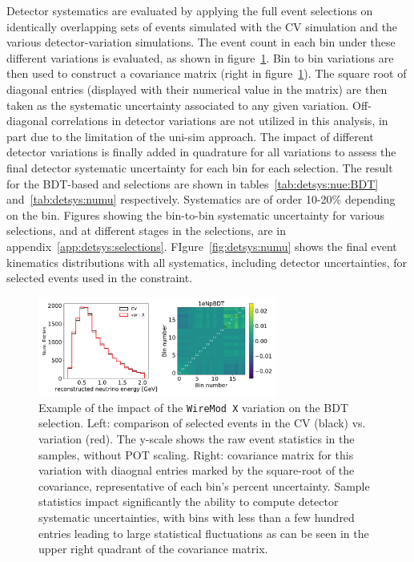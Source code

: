 \par Detector systematics are evaluated by applying the full event selections on identically overlapping sets of events simulated with the CV simulation and the various detector-variation simulations. The event count in each bin under these different variations is evaluated, as shown in figure~\ref{fig:detsys:selection}. Bin to bin variations are then used to construct a covariance matrix (right in figure~\ref{fig:detsys:selection}). The square root of diagonal entries (displayed with their numerical value in the matrix) are then taken as the systematic uncertainty associated to any given variation. Off-diagonal correlations in detector variations are not utilized in this analysis, in part due to the limitation of the uni-sim approach. The impact of different detector variations is finally added in quadrature for all variations to assess the final detector systematic uncertainty for each bin for each selection. The result for the \npsel BDT-based and \numu selections are shown in tables~\ref{tab:detsys:nue:BDT} and~\ref{tab:detsys:numu} respectively. Systematics are of order 10-20\% depending on the bin. Figures showing the bin-to-bin systematic uncertainty for various selections, and at different stages in the selections, are in appendix~\ref{app:detsys:selections}. FIgure~\ref{fig:detsys:numu} shows the final event kinematics distributions with all systematics, including detector uncertainties, for selected \numu events used in the \numu constraint.



\begin{figure}[H]
    \centering
    \includegraphics[width=0.7\textwidth]{detsys/reco_e_07252020_1eNpBDT_X.pdf}
\caption{\label{fig:detsys:selection}Example of the impact of the \texttt{WireMod X} variation on the \npsel BDT selection. Left: comparison of selected events in the CV (black) vs. variation (red). The y-scale shows the raw event statistics in the samples, without POT scaling. Right: covariance matrix for this variation with diaognal entries marked by the square-root of the covariance, representative of each bin's percent uncertainty. Sample statistics impact significantly the ability to compute detector systematic uncertainties, with bins with less than a few hundred entries leading to large statistical fluctuations as can be seen in the upper right quadrant of the covariance matrix.}
\end{figure}


